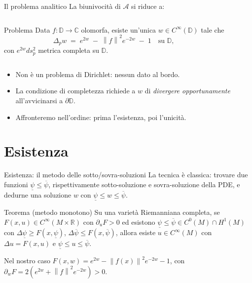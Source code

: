 \documentclass[aspectratio=169,11pt]{beamer}
\newcommand{\C}{\mathbb{C}}
\newcommand{\R}{\mathbb{R}}
\newcommand{\D}{\mathbb{D}}
\newcommand{\Amap}{\mathcal{A}}
\newcommand{\norm}[1]{\left\lVert #1 \right\rVert}
\begin{document}
\begin{frame}[t]{Il problema analitico}
  La biunivocità di $\Amap$ si riduce a:

  \vspace{2mm}
  \begin{columns}[T,onlytextwidth]
    \hfill
    \begin{block}{Problema}
      Data $f:\D\to\C$ olomorfa, esiste \alert{un'unica}
      $w\in C^\infty(\D)$ tale che
      \[
        \Delta_p w \;=\; e^{2w}\;-\;\norm{f}^2 e^{-2w}\;-\;1
        \quad\text{su }\D,
      \]
      con $e^{2w}ds_p^2$ \alert{metrica completa} su $\D$.
    \end{block}
    \hfill
  \end{columns}

  \vspace{3mm}
  \begin{itemize}\itemsep=2pt
    \item Non è un problema di Dirichlet: \alert{nessun dato al bordo}.
    \item La condizione di completezza richiede a $w$ di
          \emph{divergere opportunamente} all'avvicinarsi a $\partial\D$.
    \item Affronteremo nell'ordine: prima l'\alert{esistenza}, poi
          l'\alert{unicità}.
  \end{itemize}
\end{frame}


\section{Esistenza}

\begin{frame}[t]{Esistenza: il metodo delle sotto/sovra-soluzioni}
  La tecnica è classica: trovare due funzioni $\underline\psi\le\overline\psi$,
  rispettivamente \alert{sotto-soluzione} e \alert{sovra-soluzione}
  della PDE, e dedurne una soluzione $w$ con $\underline\psi\le w\le\overline\psi$.

  \vspace{2mm}
  \begin{block}{Teorema (metodo monotono)}
    Su una varietà Riemanniana completa, se $F(x,u)\in C^\infty(M\times\R)$
    con $\partial_u F>0$ ed esistono
    $\underline\psi\le\overline\psi\in C^0(M)\cap H^1(M)$ con
    $\Delta\underline\psi\ge F(x,\underline\psi)$,
    $\Delta\overline\psi\le F(x,\overline\psi)$,
    allora esiste $u\in C^\infty(M)$ con
    $\Delta u=F(x,u)$ e $\underline\psi\le u\le\overline\psi$.
  \end{block}

  \vspace{2mm}
  Nel nostro caso $F(x,w)=e^{2w}-\norm{f(x)}^2 e^{-2w}-1$, con
  $\partial_w F = 2(e^{2w}+\norm{f}^2 e^{-2w}) > 0$.
\end{frame}
\end{document}
